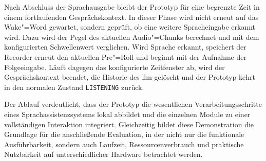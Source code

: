 Nach Abschluss der Sprachausgabe bleibt der Prototyp für eine begrenzte Zeit in einem fortlaufenden Gesprächskontext. In dieser Phase wird nicht erneut auf das Wake"=Word gewartet, sondern geprüft, ob eine weitere Spracheingabe erkannt wird. Dazu wird der Pegel des aktuellen Audio"=Chunks berechnet und mit dem konfigurierten Schwellenwert verglichen. Wird Sprache erkannt, speichert der Recorder erneut den aktuellen Pre"=Roll und beginnt mit der Aufnahme der Folgeeingabe. Läuft dagegen das konfigurierte Zeitfenster ab, wird der Gesprächskontext beendet, die Historie des \gls{llm} gelöscht und der Prototyp kehrt in den normalen Zustand \texttt{LISTENING} zurück.

Der Ablauf verdeutlicht, dass der Prototyp die wesentlichen Verarbeitungsschritte eines Sprachassistenzsystems lokal abbildet und die einzelnen Module zu einer vollständigen Interaktion integriert. Gleichzeitig bildet diese Demonstration die Grundlage für die anschließende Evaluation, in der nicht nur die funktionale Ausführbarkeit, sondern auch Laufzeit, Ressourcenverbrauch und praktische Nutzbarkeit auf unterschiedlicher Hardware betrachtet werden.